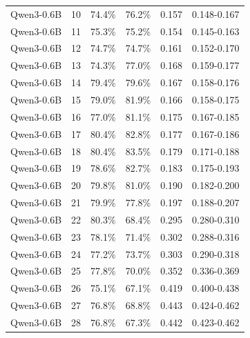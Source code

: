 \begin{table}[t]
\begin{tabular}{lrrrrr}
Qwen3-0.6B & 10 & 74.4\% & 76.2\% & 0.157 & 0.148-0.167 \\
Qwen3-0.6B & 11 & 75.3\% & 75.2\% & 0.154 & 0.145-0.163 \\
Qwen3-0.6B & 12 & 74.7\% & 74.7\% & 0.161 & 0.152-0.170 \\
Qwen3-0.6B & 13 & 74.3\% & 77.0\% & 0.168 & 0.159-0.177 \\
Qwen3-0.6B & 14 & 79.4\% & 79.6\% & 0.167 & 0.158-0.176 \\
Qwen3-0.6B & 15 & 79.0\% & 81.9\% & 0.166 & 0.158-0.175 \\
Qwen3-0.6B & 16 & 77.0\% & 81.1\% & 0.175 & 0.167-0.185 \\
Qwen3-0.6B & 17 & 80.4\% & 82.8\% & 0.177 & 0.167-0.186 \\
Qwen3-0.6B & 18 & 80.4\% & 83.5\% & 0.179 & 0.171-0.188 \\
Qwen3-0.6B & 19 & 78.6\% & 82.7\% & 0.183 & 0.175-0.193 \\
Qwen3-0.6B & 20 & 79.8\% & 81.0\% & 0.190 & 0.182-0.200 \\
Qwen3-0.6B & 21 & 79.9\% & 77.8\% & 0.197 & 0.188-0.207 \\
Qwen3-0.6B & 22 & 80.3\% & 68.4\% & 0.295 & 0.280-0.310 \\
Qwen3-0.6B & 23 & 78.1\% & 71.4\% & 0.302 & 0.288-0.316 \\
Qwen3-0.6B & 24 & 77.2\% & 73.7\% & 0.303 & 0.290-0.318 \\
Qwen3-0.6B & 25 & 77.8\% & 70.0\% & 0.352 & 0.336-0.369 \\
Qwen3-0.6B & 26 & 75.1\% & 67.1\% & 0.419 & 0.400-0.438 \\
Qwen3-0.6B & 27 & 76.8\% & 68.8\% & 0.443 & 0.424-0.462 \\
Qwen3-0.6B & 28 & 76.8\% & 67.3\% & 0.442 & 0.423-0.462 \\
\bottomrule
\end{tabular}
\end{table}
